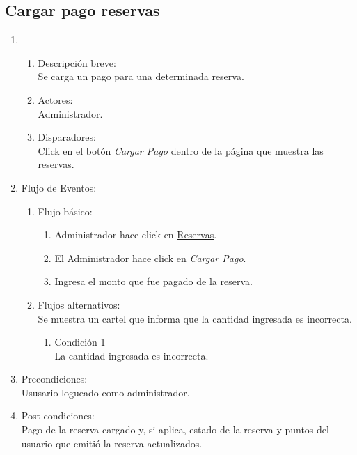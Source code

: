 \documentclass[a4paper,11pt]{article}
\begin{document}
\subsection{Cargar pago reservas}
\begin{enumerate}
    \item
    \begin{enumerate}
    \item Descripci\'on breve: \\
        Se carga un pago para una determinada reserva.
    \item Actores: \\
        Administrador.
    \item Disparadores: \\
        Click en el bot\'on \emph{Cargar Pago} dentro de la
        p\'agina que muestra las reservas.
    \end{enumerate}

    \item Flujo de Eventos: 

    \begin{enumerate}

        \item Flujo b\'asico:
	\begin{enumerate}
            \item Administrador hace click en \underline{Reservas}. 
	    \item El Administrador hace click en \emph{Cargar Pago}. 
	    \item Ingresa el monto que fue pagado de la reserva.
	\end{enumerate}

        \item Flujos alternativos:\\
            Se muestra un cartel que informa que la cantidad ingresada es
            incorrecta.
            \begin{enumerate}
                \item Condici\'on 1 \\
                    La cantidad ingresada es incorrecta.
            \end{enumerate}

    \end{enumerate}

    \item Precondiciones: \\
        Ususario logueado como administrador.

    \item Post condiciones: \\
        Pago de la reserva cargado y, si aplica, estado de la reserva y puntos
        del usuario que emiti\'o la reserva actualizados.

\end{enumerate}
\end{document}
